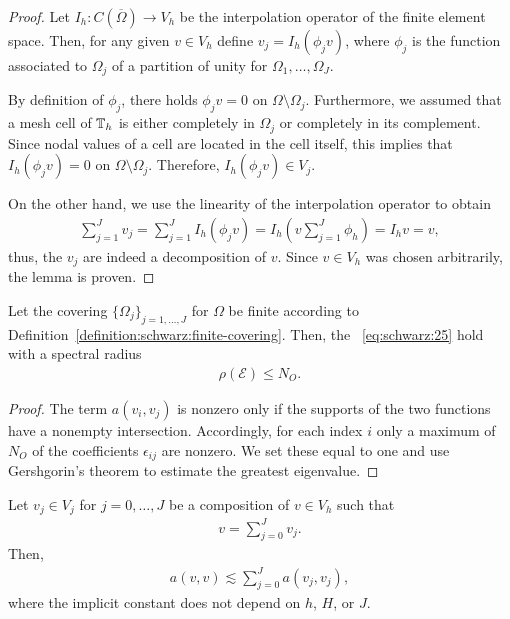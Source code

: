 \begin{proof}
  Let $I_h: C(\overline\Omega) \to V_h$ be the interpolation operator
  of the finite element space. Then, for any given $v\in V_h$ define
  $v_j = I_h(\phi_j v)$, where $\phi_j$ is the function associated to
  $\Omega_j$ of a partition of unity for $\Omega_1,\dots,\Omega_J$.
  
  By definition of $\phi_j$, there holds $\phi_j v = 0$ on
  $\Omega\setminus\Omega_j$. Furthermore, we assumed that a mesh cell
  of $\mathbb T_h$ is either completely in $\Omega_j$ or completely in its
  complement. Since nodal values of a cell are located in the cell
  itself, this implies that $I_h (\phi_j v) = 0$ on
  $\Omega\setminus\Omega_j$. Therefore, $I_h (\phi_j v) \in V_j$.
  
  On the other hand, we use the linearity of the interpolation
  operator to obtain
  \begin{gather*}
    \sum_{j=1}^J v_j = \sum_{j=1}^J I_h(\phi_j v)
    = I_h\left(v\sum_{j=1}^J \phi_h\right)
    = I_h v = v,
  \end{gather*}
  thus, the $v_j$ are indeed a decomposition of $v$. Since $v\in V_h$
  was chosen arbitrarily, the lemma is proven.
\end{proof}

\begin{lemma}
  \label{lemma:schwarz:8}
  Let the covering $\{\Omega_j\}_{j=1,\dots,J}$ for $\Omega$ be finite
  according to
  Definition~\ref{definition:schwarz:finite-covering}. Then, the
  ~\eqref{eq:schwarz:25} hold
  with a spectral radius
  \begin{gather}
    \label{eq:schwarz:26}
    \rho(\mathcal E) \le N_O.
  \end{gather}
\end{lemma}

\begin{proof}
  The term $a(v_i, v_j)$ is nonzero only if the supports of the two
  functions have a nonempty intersection. Accordingly, for each index
  $i$ only a maximum of $N_O$ of the coefficients $\epsilon_{ij}$ are
  nonzero. We set these equal to one and use Gershgorin's theorem to
  estimate the greatest eigenvalue.
\end{proof}

\begin{lemma}
  \label{lemma:schwarz:6}
  Let $v_j\in V_j$ for $j=0,\dots,J$ be a composition of $v\in V_h$
  such that
  \begin{gather*}
    v=\sum_{j=0}^J v_j.
  \end{gather*}
  Then,
  \begin{gather}
    \label{eq:schwarz:12}
    a(v,v) \lesssim \sum_{j=0}^J a(v_j, v_j),
  \end{gather}
  where the implicit constant does not depend on $h$, $H$, or $J$.
\end{lemma}

